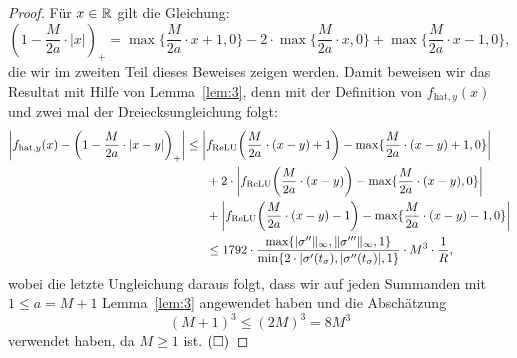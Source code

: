   \begin{proof}
  Für $x \in \mathbb{R}$ gilt die Gleichung:
\begin{equation}
\label{lem:4:eq}
 (1 - \frac{M}{2a} \cdot |x|)_+ = \max\{\frac{M}{2a} \cdot x + 1, 0\} - 2 \cdot \max\{\frac{M}{2a} \cdot x, 0\} + \max\{\frac{M}{2a} \cdot x - 1, 0\}, 
 \end{equation}  
die wir im zweiten Teil dieses Beweises zeigen werden. Damit beweisen wir das Resultat mit Hilfe von Lemma~\ref{lem:3}, denn mit der Definition von $f_{\mathrm{hat},y}(x)$ und zwei mal der Dreiecksungleichung folgt:
\begin{equation*}
\begin{split}
\bigg|f_{\mathrm{hat},y}(x) - \bigg(1 - \frac{M}{2a} \cdot |x - y|\bigg)_+\bigg| \leq \bigg|&f_{\mathrm{ReLU}} \bigg(\frac{M}{2a} \cdot (x - y) + 1\bigg) - \max\{\frac{M}{2a} \cdot (x - y) + 1, 0\}\bigg| \\ 
& + 2 \cdot \bigg|f_{\mathrm{ReLU}}\bigg(\frac{M}{2a} \cdot (x - y)\bigg) - \max\{\frac{M}{2a} \cdot (x - y), 0\}\bigg| \\
& + \bigg|f_{\mathrm{ReLU}}\bigg(\frac{M}{2a} \cdot (x - y) - 1\bigg) - \max\{\frac{M}{2a} \cdot (x - y) - 1, 0\}\bigg|\\ 
& \leq 1792 \cdot \frac{\max\{|\sigma''\|_{\infty}, \|\sigma'''\|_{\infty}, 1\}}{\min\{2 \cdot |\sigma'(t_{\sigma}), |\sigma''(t_{\sigma})|, 1\}} \cdot M^3 \cdot \frac{1}{R},
\end{split}
\end{equation*} 
wobei die letzte Ungleichung daraus folgt, dass wir auf jeden Summanden mit $1 \leq a = M + 1$ Lemma~\ref{lem:3} angewendet haben und die Abschätzung 
$$ (M + 1)^3 \leq (2M)^3 = 8M^3$$ verwendet haben, da $M \geq 1$ ist. $\hfill(\square)$


\end{proof}
